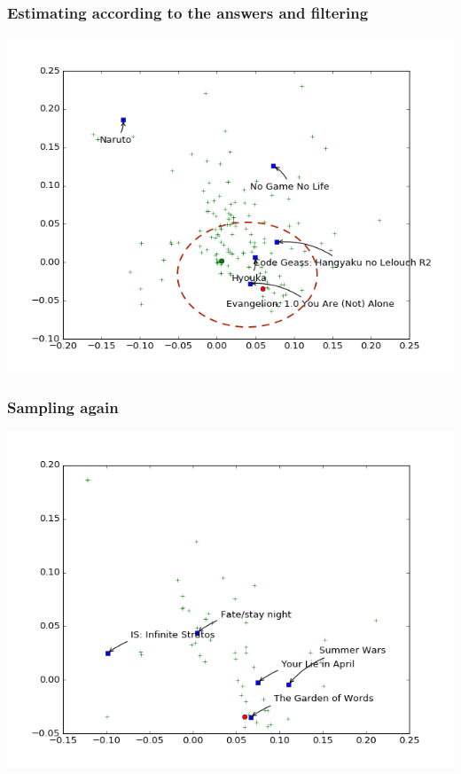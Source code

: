 \documentclass[handout]{beamer}
\begin{document}
\begin{frame}
  \frametitle{Estimating according to the answers and filtering}
  \includegraphics[width=\linewidth]{figures/2.png}
\end{frame}

\begin{frame}
  \frametitle{Sampling again}
  \includegraphics[width=\linewidth]{figures/3.png}
\end{frame}
\end{document}
